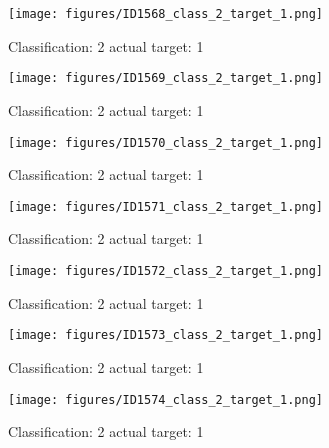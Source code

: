 \begin{figure}[h!]
\begin{center}
\texttt{[image: figures/ID1568\_class\_2\_target\_1.png]}
\end{center}
\caption{ Classification: 2 actual target: 1}
\label{fig:ID1568_class_2_target_1}
\end{figure}
\begin{figure}[h!]
\begin{center}
\texttt{[image: figures/ID1569\_class\_2\_target\_1.png]}
\end{center}
\caption{ Classification: 2 actual target: 1}
\label{fig:ID1569_class_2_target_1}
\end{figure}
\begin{figure}[h!]
\begin{center}
\texttt{[image: figures/ID1570\_class\_2\_target\_1.png]}
\end{center}
\caption{ Classification: 2 actual target: 1}
\label{fig:ID1570_class_2_target_1}
\end{figure}
\begin{figure}[h!]
\begin{center}
\texttt{[image: figures/ID1571\_class\_2\_target\_1.png]}
\end{center}
\caption{ Classification: 2 actual target: 1}
\label{fig:ID1571_class_2_target_1}
\end{figure}
\begin{figure}[h!]
\begin{center}
\texttt{[image: figures/ID1572\_class\_2\_target\_1.png]}
\end{center}
\caption{ Classification: 2 actual target: 1}
\label{fig:ID1572_class_2_target_1}
\end{figure}
\begin{figure}[h!]
\begin{center}
\texttt{[image: figures/ID1573\_class\_2\_target\_1.png]}
\end{center}
\caption{ Classification: 2 actual target: 1}
\label{fig:ID1573_class_2_target_1}
\end{figure}
\begin{figure}[h!]
\begin{center}
\texttt{[image: figures/ID1574\_class\_2\_target\_1.png]}
\end{center}
\caption{ Classification: 2 actual target: 1}
\label{fig:ID1574_class_2_target_1}
\end{figure}
